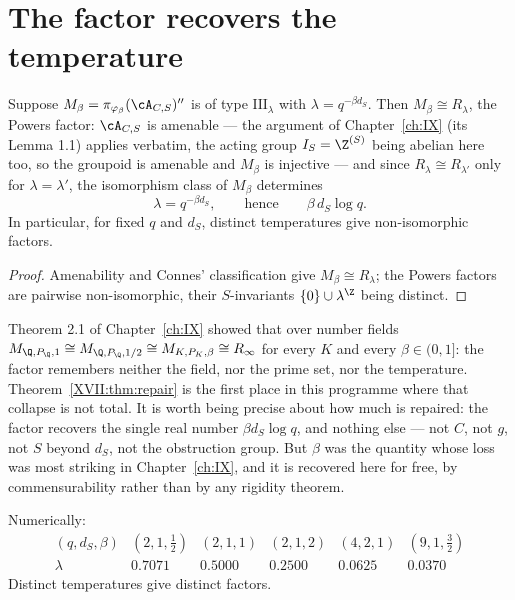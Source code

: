 \section{The factor recovers the temperature}

\begin{theorem}\label{XVII:thm:repair}
Suppose $M_\beta=\pi_{\varphi_\beta}(\cA_{C,S})''$ is of type $\mathrm{III}_\lambda$ with
$\lambda=q^{-\beta d_S}$. Then $M_\beta\cong R_\lambda$, the Powers factor: $\cA_{C,S}$ is
amenable --- the argument of Chapter~\ref{ch:IX} (its Lemma 1.1) applies verbatim, the acting group
$I_S=\Z^{(S)}$ being abelian here too, so the groupoid is amenable and $M_\beta$ is
injective --- and since $R_\lambda\cong R_{\lambda'}$ only for
$\lambda=\lambda'$, the isomorphism class of $M_\beta$ determines
\[
\lambda=q^{-\beta d_S},\qquad\text{hence}\qquad \beta\,d_S\log q .
\]
In particular, for fixed $q$ and $d_S$, distinct temperatures give non-isomorphic factors.
\end{theorem}

\begin{proof}
Amenability and Connes' classification give $M_\beta\cong R_\lambda$; the Powers factors are
pairwise non-isomorphic, their $S$-invariants $\{0\}\cup\lambda^\Z$ being distinct.
\end{proof}

\begin{remark}\label{XVII:rem:changes}
Theorem 2.1 of Chapter~\ref{ch:IX} showed that over number fields
$M_{\Q,P_\Q,1}\cong M_{\Q,P_\Q,1/2}\cong M_{K,P_K,\beta}\cong R_\infty$ for every $K$ and
every $\beta\in(0,1]$: the factor remembers neither the field, nor the prime set, nor the
temperature. Theorem~\ref{XVII:thm:repair} is the first place in this programme where that
collapse is not total. It is worth being precise about how much is repaired: the factor
recovers the single real number $\beta d_S\log q$, and nothing else --- not $C$, not $g$, not
$S$ beyond $d_S$, not the obstruction group. But $\beta$ was the quantity whose loss was most
striking in Chapter~\ref{ch:IX}, and it is recovered here for free, by commensurability rather
than by any rigidity theorem.

Numerically:
\[
\begin{array}{lccccc}
(q,d_S,\beta) & (2,1,\tfrac12) & (2,1,1) & (2,1,2) & (4,2,1) & (9,1,\tfrac32)\\
\lambda & 0.7071 & 0.5000 & 0.2500 & 0.0625 & 0.0370
\end{array}
\]
Distinct temperatures give distinct factors.
\end{remark}

